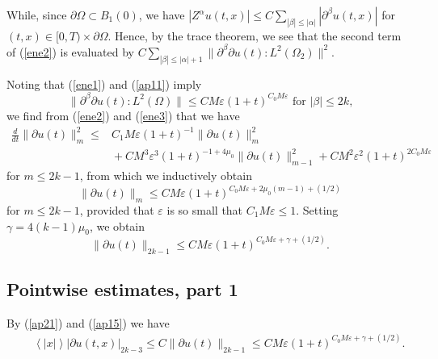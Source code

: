 \documentclass[12pt]{amsart}
\newcommand{\ve}{\varepsilon}
\newcommand{\pa}{\partial}
\newcommand{\jb}[1]{\left\langle #1 \right\rangle}
\numberwithin{equation}{section}
\begin{document}
While, since $\partial \Omega \subset B_{1}(0)$, we have
$|Z^\alpha u(t,x)| \le C\sum_{|\beta| \le |\alpha|} |\partial^\beta u(t,x)|$
for $(t,x)\in [0,T) \times \partial \Omega$.
Hence, by the trace theorem, we see that the second term of (\ref{ene2}) is evaluated by
$C \sum_{|\beta| \le |\alpha|+1} \|\partial^\beta \partial u(t)\!:\!{L^2(\Omega_{2})}\|^2$.

Noting that (\ref{ene1}) and (\ref{ap11}) imply  
\begin{equation}
\label{LEK}
 \|\partial^\beta \partial u(t)\!:\!{L^2(\Omega)}\| \le CM\ve (1+t)^{C_0 M\ve}
\text{ for $|\beta| \le 2k$,} 
\end{equation}
we find from (\ref{ene2}) and (\ref{ene3}) that we have
\begin{align*}
\frac{d}{dt}\|\pa u(t)\|_{m}^2 \le &
C_1 M\ve (1+t)^{-1} \|\pa u(t)\|_{m}^2\\
&{}+CM^3\ve^3 (1+t)^{-1+4\mu_0}\|\pa u(t)\|_{m-1}^2+CM^2\ve^2 (1+t)^{2C_0 M\ve}
\end{align*}
for $m\le 2k-1$,
from which we inductively obtain
\begin{equation}%
\|\pa u(t)\|_{m}\le CM\ve (1+t)^{C_0M\ve+2\mu_0(m-1)+(1/2)}
\end{equation}
for $m\le 2k-1$,
provided that $\ve$ is so small that $C_1 M\ve \le 1$.
Setting $\gamma=4(k-1)\mu_0$, we obtain
\begin{equation}\label{ap15}
\|\pa u(t)\|_{2k-1}\le CM\ve (1+t)^{C_0M\ve+\gamma+(1/2)}.
\end{equation}
\subsection{Pointwise estimates, part 1}
By (\ref{ap21}) and (\ref{ap15}) we have
\begin{eqnarray}\label{ap21-}
&& \jb{|x|} |\partial u(t,x)|_{2k-3} 
\le C \|\partial u(t)\|_{2k-1} 
 \le  CM\ve (1+t)^{C_0M\ve+\gamma+(1/2)}.
\end{eqnarray}
\end{document}
